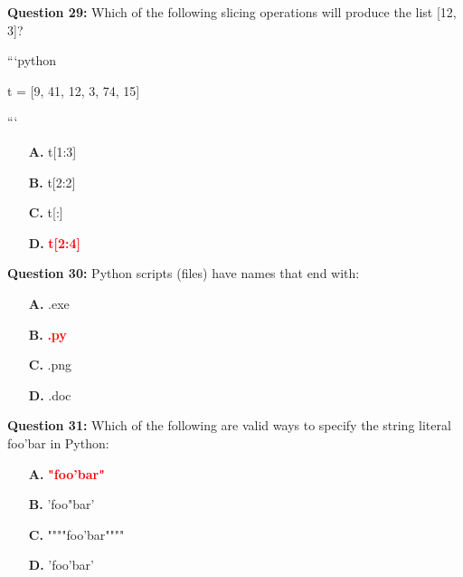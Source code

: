\documentclass[12pt,a4paper]{article}
\begin{document}
\vspace{0.5cm}

\textbf{Question 29:} Which of the following slicing operations will produce the list [12, 3]?\newline

\newline
\newline

\newline
```python\newline

\newline
t = [9, 41, 12, 3, 74, 15]\newline

\newline
```

\begin{itemize}
    \item[\textbf{A.}] t[1:3]
    \item[\textbf{B.}] t[2:2]
    \item[\textbf{C.}] t[:]
    \item[\textbf{D.}] \textcolor{red}{\textbf{t[2:4]}}
\end{itemize}

\vspace{0.5cm}

\textbf{Question 30:} Python scripts (files) have names that end with:

\begin{itemize}
    \item[\textbf{A.}] .exe
    \item[\textbf{B.}] \textcolor{red}{\textbf{.py}}
    \item[\textbf{C.}] .png
    \item[\textbf{D.}] .doc
\end{itemize}

\vspace{0.5cm}

\textbf{Question 31:} Which of the following are valid ways to specify the string literal foo'bar in Python:

\begin{itemize}
    \item[\textbf{A.}] \textcolor{red}{\textbf{"foo'bar"}}
    \item[\textbf{B.}] 'foo"bar'
    \item[\textbf{C.}] """"foo'bar""""
    \item[\textbf{D.}] 'foo'bar'
\end{itemize}
\end{document}
